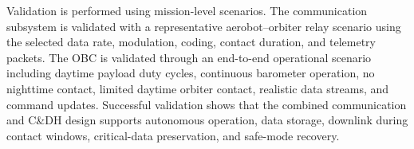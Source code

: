 Validation is performed using mission-level scenarios. The communication subsystem is validated with a representative aerobot--orbiter relay scenario using the selected data rate, modulation, coding, contact duration, and telemetry packets. The OBC is validated through an end-to-end operational scenario including daytime payload duty cycles, continuous barometer operation, no nighttime contact, limited daytime orbiter contact, realistic data streams, and command updates. Successful validation shows that the combined communication and C\&DH design supports autonomous operation, data storage, downlink during contact windows, critical-data preservation, and safe-mode recovery.